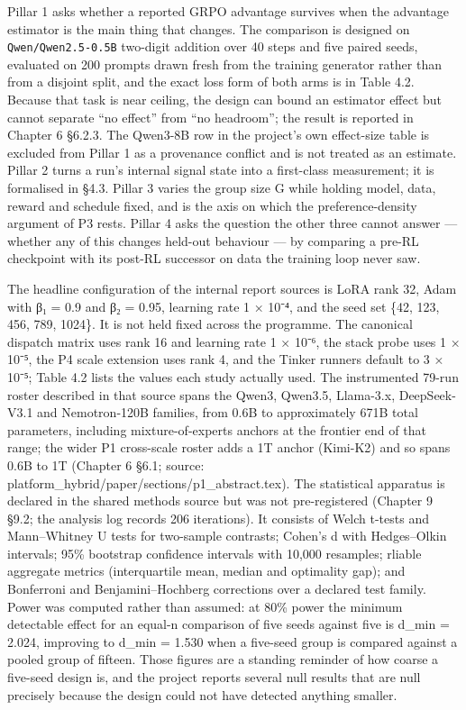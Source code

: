 \documentclass[12pt,a4paper]{report}
\begin{document}
Pillar 1 asks whether a reported GRPO advantage survives when the
advantage estimator is the main thing that changes. The comparison is
designed on \texttt{Qwen/Qwen2.5-0.5B} two-digit addition over 40 steps
and five paired seeds, evaluated on 200 prompts drawn fresh from the
training generator rather than from a disjoint split, and the exact loss
form of both arms is in Table 4.2. Because that task is near ceiling,
the design can bound an estimator effect but cannot separate ``no
effect'' from ``no headroom''; the result is reported in Chapter 6
§6.2.3. The Qwen3-8B row in the project's own effect-size table is
excluded from Pillar 1 as a provenance conflict and is not treated as an
estimate. Pillar 2 turns a run's internal signal state into a
first-class measurement; it is formalised in §4.3. Pillar 3 varies the
group size G while holding model, data, reward and schedule fixed, and
is the axis on which the preference-density argument of P3 rests. Pillar
4 asks the question the other three cannot answer --- whether any of
this changes held-out behaviour --- by comparing a pre-RL checkpoint
with its post-RL successor on data the training loop never saw.

The headline configuration of the internal report sources is LoRA rank
32, Adam with β₁ = 0.9 and β₂ = 0.95, learning rate 1 × 10⁻⁴, and the
seed set \{42, 123, 456, 789, 1024\}. It is not held fixed across the
programme. The canonical dispatch matrix uses rank 16 and learning rate
1 × 10⁻⁶, the stack probe uses 1 × 10⁻⁵, the P4 scale extension uses
rank 4, and the Tinker runners default to 3 × 10⁻⁵; Table 4.2 lists the
values each study actually used. The instrumented 79-run roster
described in that source spans the Qwen3, Qwen3.5, Llama-3.x,
DeepSeek-V3.1 and Nemotron-120B families, from 0.6B to approximately
671B total parameters, including mixture-of-experts anchors at the
frontier end of that range; the wider P1 cross-scale roster adds a 1T
anchor (Kimi-K2) and so spans 0.6B to 1T (Chapter 6 §6.1; source:
platform\_hybrid/paper/sections/p1\_abstract.tex). The statistical
apparatus is declared in the shared methods source but was not
pre-registered (Chapter 9 §9.2; the analysis log records 206
iterations). It consists of Welch t-tests and Mann--Whitney U tests for
two-sample contrasts; Cohen's d with Hedges--Olkin intervals; 95\%
bootstrap confidence intervals with 10,000 resamples; rliable aggregate
metrics (interquartile mean, median and optimality gap); and Bonferroni
and Benjamini--Hochberg corrections over a declared test family. Power
was computed rather than assumed: at 80\% power the minimum detectable
effect for an equal-n comparison of five seeds against five is d\_min =
2.024, improving to d\_min = 1.530 when a five-seed group is compared
against a pooled group of fifteen. Those figures are a standing reminder
of how coarse a five-seed design is, and the project reports several
null results that are null precisely because the design could not have
detected anything smaller.
\end{document}
